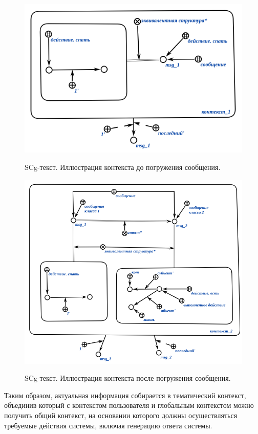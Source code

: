 \begin{figure}[H]
    \caption{SCg-текст. Иллюстрация контекста до погружения сообщения.}
    \includegraphics[scale=0.8]{images/part4/chapter_nl_interfaces/context_1}
    \label{fig:context_before_update}
\end{figure}

\begin{figure}[h]
	\caption{SCg-текст. Иллюстрация контекста после погружения сообщения.}
    \includegraphics[scale=0.8]{images/part4/chapter_nl_interfaces/context_2}
    \label{fig:updated_context}
\end{figure}

Таким образом, актуальная информация собирается в тематический контекст, объединив который с контекстом пользователя и глобальным контекстом можно получить общий контекст, на основании которого должны осуществляться требуемые действия системы, включая генерацию ответа системы.

